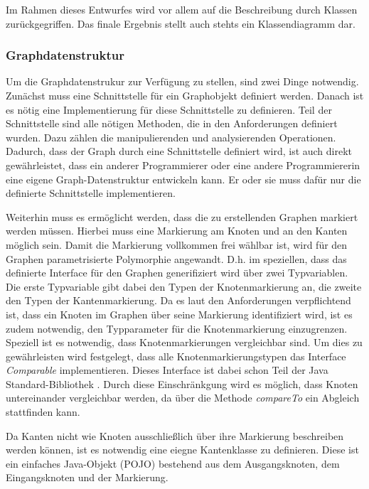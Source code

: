 \documentclass[a4paper,12pt,ngerman,chapterprefix=false,listof=totoc,bibliography=totoc]{scrreprt}
\begin{document}
{{{Im Rahmen dieses Entwurfes wird vor allem auf die Beschreibung durch Klassen zurückgegriffen. Das finale Ergebnis stellt auch stehts ein Klassendiagramm dar.
}
\subsubsection*{Graphdatenstruktur}
{
Um die Graphdatenstrukur zur Verfügung zu stellen, sind zwei Dinge notwendig. Zunächst muss eine Schnittstelle für ein Graphobjekt definiert werden. Danach ist es nötig eine Implementierung für diese Schnittstelle zu definieren. Teil der Schnittstelle sind alle nötigen Methoden, die in den Anforderungen definiert wurden. Dazu zählen die manipulierenden und analysierenden Operationen. Dadurch, dass der Graph durch eine Schnittstelle definiert wird, ist auch direkt gewährleistet, dass ein anderer Programmierer oder eine andere Programmiererin eine eigene Graph-Datenstruktur entwickeln kann. Er oder sie muss dafür nur die definierte Schnittstelle implementieren.

Weiterhin muss es ermöglicht werden, dass die zu erstellenden Graphen markiert werden müssen. Hierbei muss eine Markierung am Knoten und an den Kanten möglich sein. Damit die Markierung vollkommen frei wählbar ist, wird für den Graphen parametrisierte Polymorphie angewandt. D.h. im speziellen, dass das definierte Interface für den Graphen generifiziert wird über zwei Typvariablen. Die erste Typvariable gibt dabei den Typen der Knotenmarkierung an, die zweite den Typen der Kantenmarkierung. Da es laut den Anforderungen verpflichtend ist, dass ein Knoten im Graphen über seine Markierung identifiziert wird, ist es zudem notwendig, den Typparameter für die Knotenmarkierung einzugrenzen. Speziell ist es notwendig, dass Knotenmarkierungen vergleichbar sind. Um dies zu gewährleisten wird festgelegt, dass alle Knotenmarkierungstypen das Interface \textit{Comparable} implementieren. Dieses Interface ist dabei schon Teil der Java Standard-Bibliothek \cite{oracle_java_2021}. Durch diese Einschränkgung wird es möglich, dass Knoten untereinander vergleichbar werden, da über die Methode \textit{compareTo} ein Abgleich stattfinden kann.

Da Kanten nicht wie Knoten ausschließlich über ihre Markierung beschreiben werden können, ist es notwendig eine eiegne Kantenklasse zu definieren. Diese ist ein einfaches Java-Objekt (POJO) bestehend aus dem Ausgangsknoten, dem Eingangsknoten und der Markierung.

}}}
\end{document}
